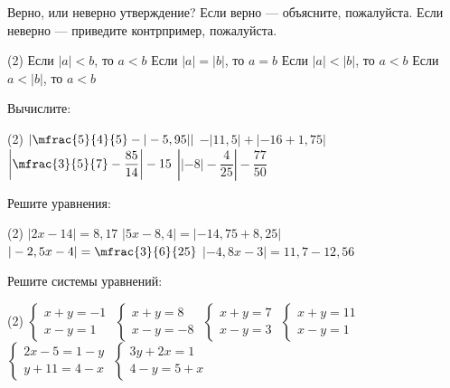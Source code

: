 \begin{class}[number=6]
	\begin{listofex}
		\item Верно, или неверно утверждение? Если верно --- объясните, пожалуйста. Если неверно --- приведите контрпример, пожалуйста.
		\begin{tasks}(2)
			\task Если \(|a|<b \), то \( a<b \)
			\task Если \( |a|=|b| \), то \( a=b \)
			\task Если \( |a|<|b| \), то \( a<b \)
			\task Если \( a<|b| \), то \( a<b \)
		\end{tasks}
		
		\item Вычислите:
		\begin{tasks}(2)
			\task \( \left| \mfrac{ 5}{4 }{ 5}-|-5,95| \right| \)
			\task \( -|11,5|+|-16+1,75| \)
			\task \( \left| \mfrac{3 }{ 5}{7 }-\dfrac{ 85 }{ 14 } \right|-15 \)
			\task \( \left| |-8|-\dfrac{ 4 }{ 25 } \right|-\dfrac{ 77 }{ 50 } \)
		\end{tasks}
		
		\item Решите уравнения:
		\begin{tasks}(2)
			\task \( |2x-14|=8,17 \)
			\task \( |5x-8,4|=|-14,75+8,25| \)
			\task \( |-2,5x-4|=\mfrac{3 }{6 }{25 } \)
			\task \( |-4,8x-3|=11,7-12,56 \)
		\end{tasks}
		
		\item Решите системы уравнений: %
		\begin{tasks}(2)
			\task \( \begin{cases} x+y=-1 \\ x-y=1 \end{cases} \)
			\task \( \begin{cases} x+y=8 \\ x-y=-8 \end{cases} \)
			\task \( \begin{cases} x+y=7 \\ x-y=3 \end{cases} \)
			\task \( \begin{cases} x+y=11 \\ x-y=1 \end{cases} \)
			\task \( \begin{cases} 2x-5=1-y \\ y+11=4-x \end{cases} \)
			\task \( \begin{cases} 3y+2x=1 \\ 4-y=5+x \end{cases} \)
		\end{tasks}
	\end{listofex}
\end{class}

